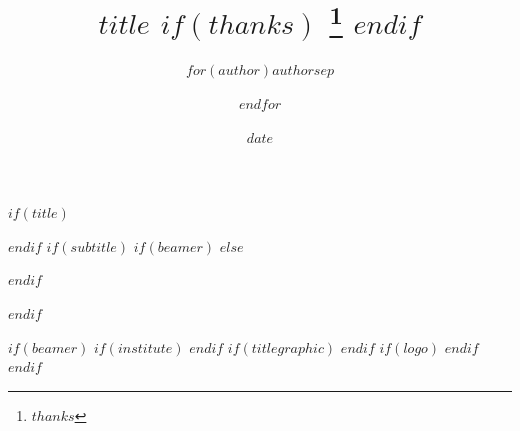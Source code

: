 \usepackage{titling}
\posttitle{\end{center}}
$if(title)$
\title{
$title$
$if(thanks)$
\thanks{$thanks$}
$endif$
}
$endif$
$if(subtitle)$
$if(beamer)$
$else$
\usepackage{etoolbox}
\makeatletter
\providecommand{\subtitle}[1]{%
  \apptocmd{\@title}{\par {\large #1 \par}}{}{}
}
\makeatother
$endif$
\subtitle{$subtitle$}
$endif$
\author{$for(author)$$author$$sep$ \and $endfor$}
\date{$date$}
$if(beamer)$
$if(institute)$
$endif$
$if(titlegraphic)$
$endif$
$if(logo)$
$endif$
$endif$
\usepackage{fancyhdr}
\pagestyle{fancy}
